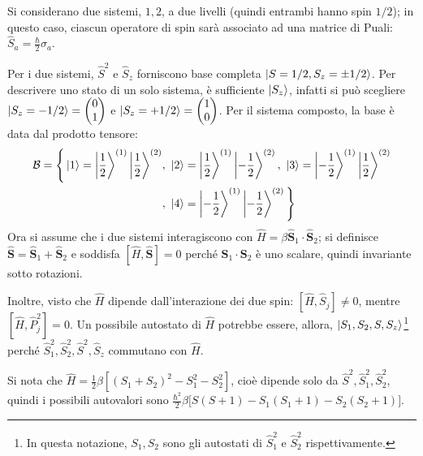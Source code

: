 \documentclass[10pt, a4paper]{scrartcl} %
\numberwithin{equation}{subsection}
\theoremstyle{style2}
\theoremstyle{style1}
\begin{document}
Si considerano due sistemi, $1,2$, a due livelli (quindi entrambi hanno spin $1 / 2$); in questo caso, ciascun operatore di spin sar\`a associato ad una matrice di Puali: $\hat{S}_a = \frac{\hbar}{2} \sigma _a$.

Per i due sistemi, $\hat{S}^2 $ e $\hat{S}_z$ forniscono base completa $\ket{S = 1 / 2, S_z = \pm 1 / 2} $. Per descrivere uno stato di un solo sistema, \`e sufficiente $\ket{S_z} $, infatti si pu\`o scegliere $\ket{S_z = - 1 /2}  = \begin{pmatrix} 0 \\ 1 \end{pmatrix} $ e $\ket{S_z = + 1 / 2}  = \begin{pmatrix} 1 \\ 0 \end{pmatrix} $. Per il sistema composto, la base \`e data dal prodotto tensore:
\begin{equation}
	\begin{split}
		\mathcal{B} = \Bigg\{ \ket{1} = \Ket{\frac{1}{2}} ^{(1)} \Ket{\frac{1}{2}}^{(2)}  &, \ \ket{2} = \Ket{\frac{1}{2}} ^{(1)} \Ket{- \frac{1}{2}} ^{(2)} , \ \ket{3}  = \Ket{- \frac{1}{2}}^{(1)} \Ket{\frac{1}{2}}^{(2)}  \\ 
												      &,\ \ket{4} = \Ket{- \frac{1}{2}} ^{(1)} \Ket{- \frac{1}{2}} ^{(2)}     \Bigg\} 
	\end{split}
\end{equation}
Ora si assume che i due sistemi interagiscono con $\hat{H} = \beta  \hat{\mathbf{S} }_1 \cdot \hat{\mathbf{S} }_2$; si definisce $\hat{\mathbf{S} }= \hat{\mathbf{S} }_1 + \hat{\mathbf{S} }_2$ e soddisfa $[\hat{H}, \hat{\mathbf{S} }] = 0$ perch\'e $\mathbf{S} _1 \cdot \mathbf{S} _2$ \`e uno scalare, quindi invariante sotto rotazioni.

Inoltre, visto che $\hat{H}$ dipende dall'interazione dei due spin: $[\hat{H}, \hat{S}_j] \neq 0$, mentre $[\hat{H},\hat{P}_j^2] = 0 $. Un possibile autostato di $\hat{H}$ potrebbe essere, allora, $\ket{S_1, S_2,S,S_z} $\footnote{In questa notazione, $S_1,S_2$ sono gli autostati di $\hat{S}_1^2$ e $\hat{S}_2^2$ rispettivamente.} perch\'e $\hat{S}_1^2, \hat{S}_2^2, \hat{S}^2, \hat{S}_z$ commutano con $\hat{H}$.

Si nota che $\hat{H} = \frac{1}{2} \beta  \left[ (S_1+S_2)^2 - S_1^2 - S_2^2 \right] $, cio\`e dipende solo da $\hat{S}^2, \hat{S}_1 ^2 , \hat{S}_2^2$, quindi i possibili autovalori sono $\frac{\hbar ^2}{2}\beta \big[S(S+1) - S_1(S_1+1) - S_2(S_2+1)\big]$.
\end{document}
